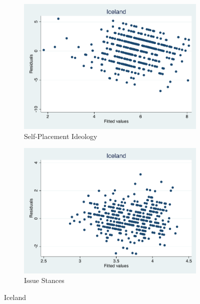 \documentclass[12pt, titlepage]{article}
\begin{document}
\begin{figure}[H]
	\centering
	\begin{subfigure}[b]{0.475\textwidth}   
		\centering 
		\includegraphics[width=\textwidth]{Residuals/CountryIdeo/Iceland}
		\caption{Self-Placement Ideology}
	\end{subfigure}
	\hfill
	\begin{subfigure}[b]{0.475\textwidth}
		\centering 
		\includegraphics[width=\textwidth]{Residuals/CountryLib/Iceland}
		\caption{Issue Stances}
	\end{subfigure}
	\caption{Iceland}
	\label{Iceland}
\end{figure}
\end{document}
